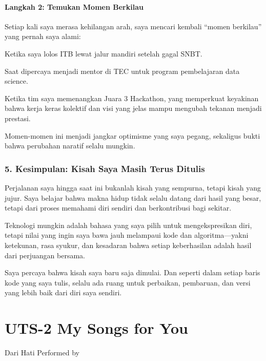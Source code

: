 \documentclass[
  letterpaper,
  DIV=11,
  numbers=noendperiod]{scrreprt}
\begin{document}
\subsubsection{Langkah 2: Temukan Momen
Berkilau}\label{langkah-2-temukan-momen-berkilau}

Setiap kali saya merasa kehilangan arah, saya mencari kembali ``momen
berkilau'' yang pernah saya alami:

Ketika saya lolos ITB lewat jalur mandiri setelah gagal SNBT.

Saat dipercaya menjadi mentor di TEC untuk program pembelajaran data
science.

Ketika tim saya memenangkan Juara 3 Hackathon, yang memperkuat keyakinan
bahwa kerja keras kolektif dan visi yang jelas mampu mengubah tekanan
menjadi prestasi.

Momen-momen ini menjadi jangkar optimisme yang saya pegang, sekaligus
bukti bahwa perubahan naratif selalu mungkin.

\subsection{\texorpdfstring{\textbf{5. Kesimpulan: Kisah Saya Masih
Terus
Ditulis}}{5. Kesimpulan: Kisah Saya Masih Terus Ditulis}}\label{kesimpulan-kisah-saya-masih-terus-ditulis}

Perjalanan saya hingga saat ini bukanlah kisah yang sempurna, tetapi
kisah yang jujur. Saya belajar bahwa makna hidup tidak selalu datang
dari hasil yang besar, tetapi dari proses memahami diri sendiri dan
berkontribusi bagi sekitar.

Teknologi mungkin adalah bahasa yang saya pilih untuk mengekspresikan
diri, tetapi nilai yang ingin saya bawa jauh melampaui kode dan
algoritma---yakni ketekunan, rasa syukur, dan kesadaran bahwa setiap
keberhasilan adalah hasil dari perjuangan bersama.

Saya percaya bahwa kisah saya baru saja dimulai. Dan seperti dalam
setiap baris kode yang saya tulis, selalu ada ruang untuk perbaikan,
pembaruan, dan versi yang lebih baik dari diri saya sendiri.


\chapter{UTS-2 My Songs for You}\label{uts-2-my-songs-for-you}

Dari Hati Performed by
\end{document}
